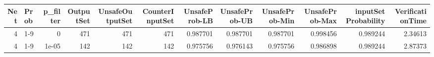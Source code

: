 \begin{tabular}{rlrrrrrrrrrr}
\hline
   Net & Prob   &   p\_filter &   OutputSet &   UnsafeOutputSet &   CounterInputSet &   UnsafeProb-LB &   UnsafeProb-UB &   UnsafeProb-Min &   UnsafeProb-Max &   inputSet Probability &   VerificationTime \\
\hline
     4 & 1-9    &      0     &         471 &               471 &               471 &        0.987701 &        0.987701 &         0.987701 &         0.998456 &               0.989244 &            2.34613 \\
     4 & 1-9    &      1e-05 &         142 &               142 &               142 &        0.975756 &        0.976143 &         0.975756 &         0.986898 &               0.989244 &            2.87373 \\
\hline
\end{tabular}

